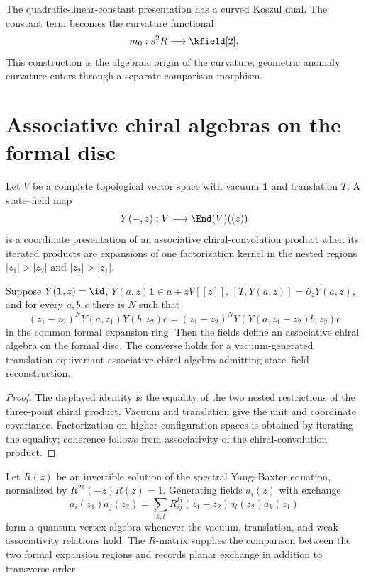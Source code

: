 The quadratic-linear-constant presentation has a curved Koszul dual. The constant term becomes the curvature functional
\[
 m_0:s^2R\longrightarrow\kfield[2].
\]
This construction is the algebraic origin of the curvature; geometric anomaly curvature enters through a separate comparison morphism.


\chapter{Associative chiral algebras on the formal disc}
Let $V$ be a complete topological vector space with vacuum $\mathbf1$ and translation $T$.  A state--field map
\[
 Y(-,z):V\longrightarrow\End(V)((z))
\]
is a coordinate presentation of an associative chiral-convolution product when its iterated products are expansions of one factorization kernel in the nested regions $|z_1|>|z_2|$ and $|z_2|>|z_1|$.

\begin{proposition}
Suppose $Y(\mathbf1,z)=\id$, $Y(a,z)\mathbf1\in a+zV[[z]]$, $[T,Y(a,z)]=\partial_zY(a,z)$, and for every $a,b,c$ there is $N$ such that
\[
 (z_1-z_2)^N Y(a,z_1)Y(b,z_2)c
 =(z_1-z_2)^N Y(Y(a,z_1-z_2)b,z_2)c
\]
in the common formal expansion ring.  Then the fields define an associative chiral algebra on the formal disc.  The converse holds for a vacuum-generated translation-equivariant associative chiral algebra admitting state--field reconstruction.
\end{proposition}
\begin{proof}
The displayed identity is the equality of the two nested restrictions of the three-point chiral product.  Vacuum and translation give the unit and coordinate covariance.  Factorization on higher configuration spaces is obtained by iterating the equality; coherence follows from associativity of the chiral-convolution product.
\end{proof}

\begin{example}
Let $R(z)$ be an invertible solution of the spectral Yang--Baxter equation, normalized by $R^{21}(-z)R(z)=1$.  Generating fields $a_i(z)$ with exchange
\[
 a_i(z_1)a_j(z_2)
 =\sum_{k,l}R_{ij}^{kl}(z_1-z_2)a_l(z_2)a_k(z_1)
\]
form a quantum vertex algebra whenever the vacuum, translation, and weak associativity relations hold.  The $R$-matrix supplies the comparison between the two formal expansion regions and records planar exchange in addition to transverse order.
\end{example}

